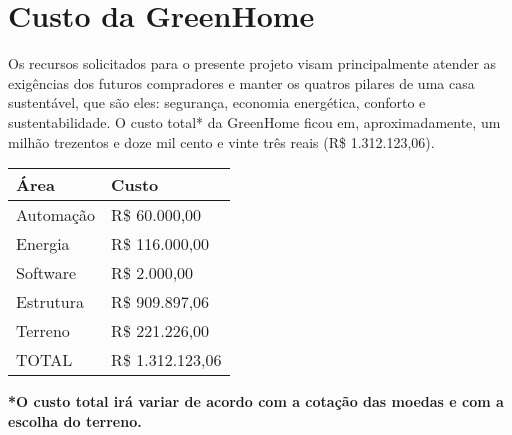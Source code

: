 \chapter[Custo da GreenHome]{Custo da GreenHome}

Os recursos solicitados para o presente projeto visam principalmente atender as exigências dos futuros compradores e manter os quatros pilares de uma casa sustentável, que são eles: segurança, economia energética, conforto e sustentabilidade. O custo total* da GreenHome ficou em, aproximadamente, um milhão trezentos e doze mil cento e vinte três reais (R\$ 1.312.123,06).

\begin{table}[H]
	\centering
	\begin{tabular}{| p{5cm} | p{5cm} |}
		\hline 
		Área & Custo\tabularnewline
		\hline 
		\hline 
		Automação & R\$ 60.000,00\tabularnewline
		\hline 
		Energia & R\$ 116.000,00\tabularnewline
		\hline 
		Software & R\$ 2.000,00\tabularnewline
		\hline 
		Estrutura & R\$ 909.897,06 \tabularnewline
		\hline 
		Terreno & R\$ 221.226,00\tabularnewline
		\hline 
		TOTAL & R\$ 1.312.123,06 \tabularnewline
		\hline 
	\end{tabular}
\end{table}

\textbf{*O custo total irá variar de acordo com a cotação das moedas e com a escolha do terreno.}